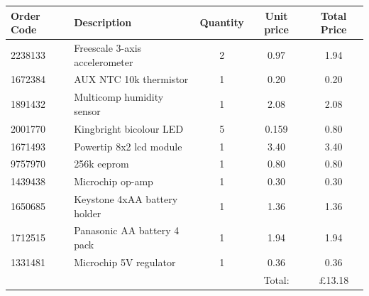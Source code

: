 \documentclass[a4paper,11pt]{article}  %
\begin{document}
\begin{tabular}{llccc}
  Order Code & Description & Quantity & Unit price & Total Price \\
  \hline
  2238133 & Freescale 3-axis accelerometer & 2 & 0.97 & 1.94 \\
  1672384 & AUX NTC 10k thermistor & 1 & 0.20 & 0.20 \\
  1891432 & Multicomp humidity sensor & 1 & 2.08 & 2.08 \\
  2001770 & Kingbright bicolour LED & 5 & 0.159 & 0.80 \\
  1671493 & Powertip 8x2 lcd module & 1 & 3.40 & 3.40 \\
  9757970 & 256k eeprom & 1 & 0.80 & 0.80 \\
  1439438 & Microchip op-amp & 1 & 0.30 & 0.30 \\
  1650685 & Keystone 4xAA battery holder & 1 & 1.36 & 1.36 \\
  1712515 & Panasonic AA battery 4 pack & 1 & 1.94 & 1.94 \\
  1331481 & Microchip 5V regulator & 1 & 0.36 & 0.36 \\
  \hline
  &&& Total: & \pounds 13.18
\end{tabular}




\end{document}
